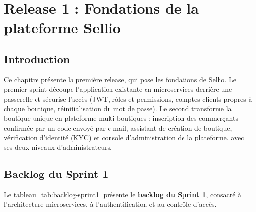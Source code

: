 \thispagestyle{fancy}
\chapter{Release 1 : Fondations de la plateforme Sellio}
\section*{Introduction}
Ce chapitre présente la première release, qui pose les fondations de Sellio. Le premier sprint découpe l'application existante en microservices derrière une passerelle et sécurise l'accès (JWT, rôles et permissions, comptes clients propres à chaque boutique, réinitialisation du mot de passe). Le second transforme la boutique unique en plateforme multi-boutiques : inscription des commerçants confirmée par un code envoyé par e-mail, assistant de création de boutique, vérification d'identité (KYC) et console d'administration de la plateforme, avec ses deux niveaux d'administrateurs.

\section{Backlog du Sprint 1}
Le tableau~\ref{tab:backlog-sprint1} présente le \textbf{backlog du Sprint 1}, consacré à l'architecture microservices, à l'authentification et au contrôle d'accès.

